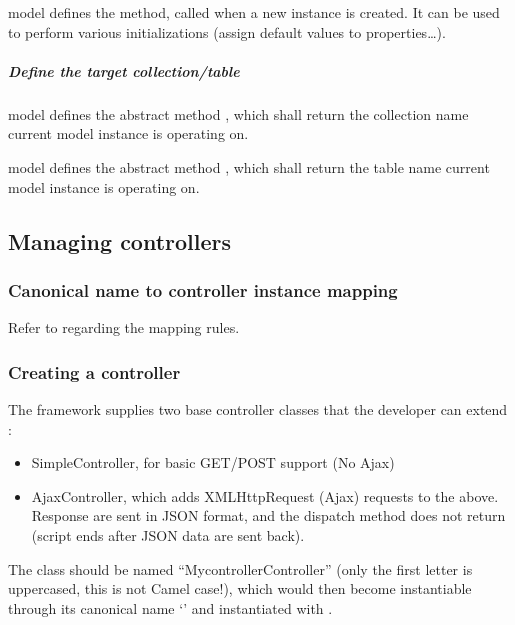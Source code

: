 \documentclass[pdftex,12pt,a4paper]{article}
\begin{document}
 model defines the  method, called when a new instance is created. It can be used to perform various initializations (\eg assign default values to properties\ldots).

\subparagraph{Define the target collection/table}

 model defines the abstract method , which shall return the collection name current model instance is operating on.

 model defines the abstract method , which shall return the table name current model instance is operating on.


\subsection{Managing controllers} \label{sec:managing-controllers}

\subsubsection{Canonical name to controller instance mapping} \label{sec:canonical-name-to-model-mapping}

Refer to  regarding the mapping rules.

\subsubsection{Creating a controller} \label{sec:creating-a-controller}

The  framework supplies two base controller classes that the developer can extend :
\begin{itemize}
	\item SimpleController, for basic GET/POST support (No Ajax)
	\item AjaxController, which adds XMLHttpRequest (Ajax) requests to the above. Response are sent in JSON format, and the dispatch method does not return (script ends after JSON data are sent back).
\end{itemize}

The class should be named ``MycontrollerController'' (only the first letter is uppercased, this is not Camel case!), which would then become instantiable through its canonical name `' and instantiated with .
\end{document}
